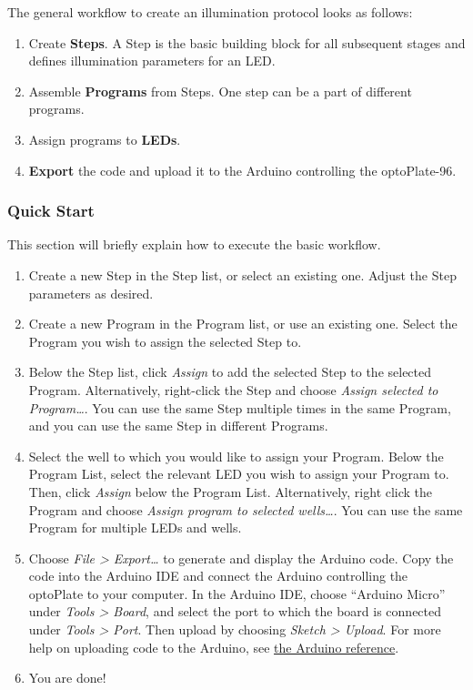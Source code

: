 The general workflow to create an illumination protocol looks as
follows:

\begin{enumerate}
\def\labelenumi{\arabic{enumi}.}
\tightlist
\item
  Create \textbf{Steps}. A Step is the basic building block for all
  subsequent stages and defines illumination parameters for an LED.
\item
  Assemble \textbf{Programs} from Steps. One step can be a part of
  different programs.
\item
  Assign programs to \textbf{LEDs}.
\item
  \textbf{Export} the code and upload it to the Arduino controlling the
  optoPlate-96.
\end{enumerate}

\hypertarget{quick-start}{%
\subsubsection{Quick Start}\label{quick-start}}

This section will briefly explain how to execute the basic workflow.

\begin{enumerate}
\def\labelenumi{\arabic{enumi}.}
\tightlist
\item
  Create a new Step in the Step list, or select an existing one. Adjust
  the Step parameters as desired.
\item
  Create a new Program in the Program list, or use an existing one.
  Select the Program you wish to assign the selected Step to.
\item
  Below the Step list, click \emph{Assign} to add the selected Step to
  the selected Program. Alternatively, right-click the Step and choose
  \emph{Assign selected to Program\ldots{}}. You can use the same Step
  multiple times in the same Program, and you can use the same Step in
  different Programs.
\item
  Select the well to which you would like to assign your Program. Below
  the Program List, select the relevant LED you wish to assign your
  Program to. Then, click \emph{Assign} below the Program List.
  Alternatively, right click the Program and choose \emph{Assign program
  to selected wells\ldots{}}. You can use the same Program for multiple
  LEDs and wells.
\item
  Choose \emph{File \textgreater{} Export\ldots{}} to generate and
  display the Arduino code. Copy the code into the Arduino IDE and
  connect the Arduino controlling the optoPlate to your computer. In the
  Arduino IDE, choose ``Arduino Micro'' under \emph{Tools \textgreater{}
  Board}, and select the port to which the board is connected under
  \emph{Tools \textgreater{} Port}. Then upload by choosing \emph{Sketch
  \textgreater{} Upload}. For more help on uploading code to the
  Arduino, see
  \href{https://www.arduino.cc/en/Guide/Environment\#uploading}{the
  Arduino reference}.
\item
  You are done!
\end{enumerate}

